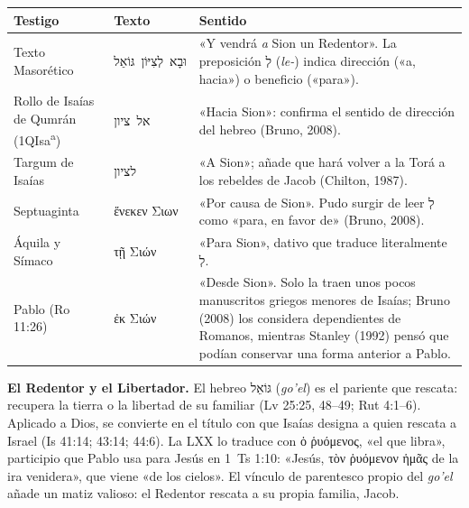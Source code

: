 \documentclass[11pt,letterpaper]{article}
\newcommand{\heb}[1]{\mbox{\foreignlanguage{hebrew}{#1}}}
\newcommand{\grc}[1]{\foreignlanguage{ancientgreek}{#1}}
\begin{document}
\begin{center}\footnotesize
\renewcommand{\arraystretch}{1.3}
\begin{tabular}{>{\RaggedRight\arraybackslash}p{3.0cm}>{\RaggedRight\arraybackslash}p{4.2cm}>{\RaggedRight\arraybackslash}p{6.6cm}}
\toprule
\textbf{Testigo} & \textbf{Texto} & \textbf{Sentido}\\
\midrule
Texto Masorético & \heb{וּבָא לְצִיּוֹן גּוֹאֵל} & «Y vendrá \emph{a} Sion un Redentor». La preposición \heb{לְ} (\emph{le-}) indica dirección («a, hacia») o beneficio («para»).\\
Rollo de Isaías de Qumrán (1QIsa\textsuperscript{a}) & \heb{אל ציון} & «Hacia Sion»: confirma el sentido de dirección del hebreo (Bruno, 2008).\\
Targum de Isaías & \heb{לציון} & «A Sion»; añade que hará volver a la Torá a los rebeldes de Jacob (Chilton, 1987).\\
Septuaginta & \grc{ἕνεκεν Σιων} & «Por causa de Sion». Pudo surgir de leer \heb{לְ} como «para, en favor de» (Bruno, 2008).\\
Áquila y Símaco & \grc{τῇ Σιών} & «Para Sion», dativo que traduce literalmente \heb{לְ}.\\
Pablo (Ro 11:26) & \grc{ἐκ Σιών} & «Desde Sion». Solo la traen unos pocos manuscritos griegos menores de Isaías; Bruno (2008) los considera dependientes de Romanos, mientras Stanley (1992) pensó que podían conservar una forma anterior a Pablo.\\
\bottomrule
\end{tabular}\end{center}

\textbf{El Redentor y el Libertador.} El hebreo \heb{גּוֹאֵל} (\emph{go'el}) es el pariente que rescata: recupera la tierra o la libertad de su familiar (Lv 25:25, 48--49; Rut 4:1--6). Aplicado a Dios, se convierte en el título con que Isaías designa a quien rescata a Israel (Is 41:14; 43:14; 44:6). La LXX lo traduce con \grc{ὁ ῥυόμενος}, «el que libra», participio que Pablo usa para Jesús en 1~Ts 1:10: «Jesús, \grc{τὸν ῥυόμενον ἡμᾶς} de la ira venidera», que viene «de los cielos». El vínculo de parentesco propio del \emph{go'el} añade un matiz valioso: el Redentor rescata a su propia familia, Jacob.
\end{document}
